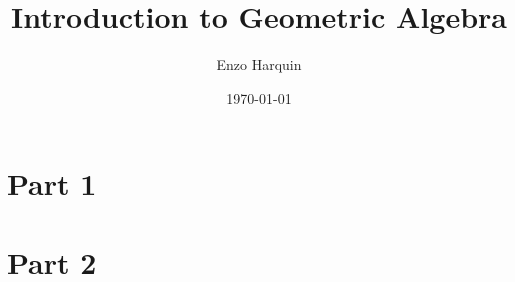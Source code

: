 



\title{Introduction to Geometric Algebra}
\author[Harquin]{Enzo Harquin}
\titlegraphic{}
\date{\today}




\begin{frame}
    \titlepage
\end{frame}



\section{Part 1}


\section{Part 2}



